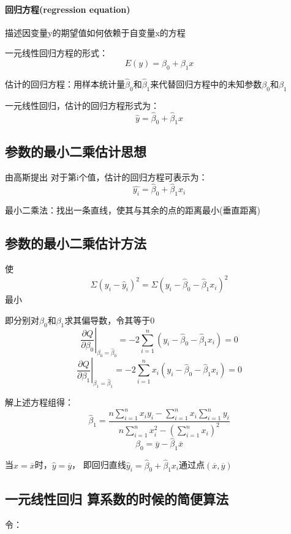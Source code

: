 \documentclass[UTF8,10pt]{book}
\begin{document}
{\paragraph{回归方程(regression equation)	}
描述因变量y的期望值如何依赖于自变量x的方程 

一元线性回归方程的形式： 
$$E(y) = \beta_0 + \beta_1 x $$ 

估计的回归方程：用样本统计量$\hat{\beta}_0$和$\hat{\beta}_1$来代替回归方程中的未知参数$\beta_0$和$\beta_1$ 

一元线性回归，估计的回归方程形式为： 
$$ \hat{y} = \hat{\beta}_0 + \hat{\beta}_1 x $$

\subsection{参数的最小二乘估计思想}	

由高斯提出 对于第i个值，估计的回归方程可表示为： 
$$ \hat{y_i} = \hat{\beta}_0 + \hat{\beta}_1 x_i $$ 

最小二乘法：找出一条直线，使其与其余的点的距离最小(垂直距离)

\subsection{参数的最小二乘估计方法}	

使 
$$\Sigma(y_i - \hat{y}_i)^2 = \Sigma(y_i - \hat{\beta}_0 - \hat{\beta}_1 x_i)^2$$ 
最小 

即分别对$\beta_0$和$\beta_1$求其偏导数，令其等于0 
$$ \left. \frac{\partial Q}{\partial \beta_0}\right|_{\beta_0 = \hat{\beta}_0} = -2 \sum_{i=1}^n (y_i - \hat{\beta}_0 - \hat{\beta}_1 x_i) = 0 $$ 
$$ \left. \frac{\partial Q}{\partial \beta_1}\right|_{\beta_1 = \hat{\beta}_1} = -2 \sum_{i=1}^n x_i(y_i - \hat{\beta}_0 - \hat{\beta}_1 x_i) = 0 $$ 

解上述方程组得： 
$$ \hat{\beta}_1 = \frac{n \sum_{i=1}^n x_i y_i - \sum_{i=1}^n x_i \sum_{i=1}^n y_i}{n \sum_{i=1}^n x_i^2 - \left(\sum_{i=1}^n x_i\right)^2} $$ 
$$\hat{\beta}_0 = \overline{y} - \hat{\beta}_1 \overline{x}$$ 

当$x=\overline{x}$时，$\hat{y}=\overline{y}$，
即回归直线$\hat{y}_i=\hat{\beta}_0+\hat{\beta}_1 x_i$通过点$(\overline{x},\overline{y})$


\subsection{一元线性回归 算系数的时候的简便算法}	
令： 

}
\end{document}
